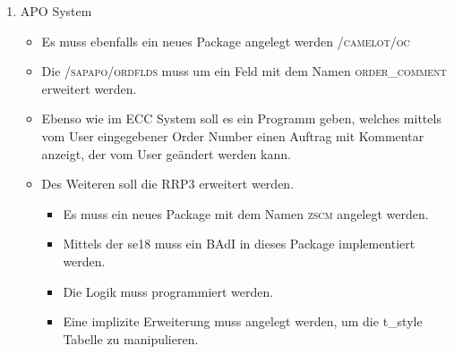 \begin{enumerate}[itemsep=0em,partopsep=0em,parsep=0em,topsep=0em]
\begin{enumerate}
\begin{itemize}
		\end{itemize} 
	\item APO System 
		\begin{itemize}
		\item Es muss ebenfalls ein neues Package angelegt werden \textsc{/camelot/oc}
		\item Die \textsc{/sapapo/ordflds} muss um ein Feld mit dem Namen \textsc{order\_comment} erweitert werden.
		\item Ebenso wie im ECC System soll es ein Programm geben, welches mittels vom User eingegebener Order Number einen Auftrag mit Kommentar anzeigt, der vom User geändert werden kann.
		\item Des Weiteren soll die RRP3 erweitert werden.
		\begin{itemize}
			\item Es muss ein neues Package mit dem Namen \textsc{zscm} angelegt werden.
			\item Mittels der se18 muss ein BAdI in dieses Package implementiert werden.
			\item Die Logik muss programmiert werden.
			\item Eine implizite Erweiterung muss angelegt werden, um die t\_style Tabelle zu manipulieren.
		\end{itemize}
		\end{itemize}
	\end{enumerate}
\end{enumerate}
